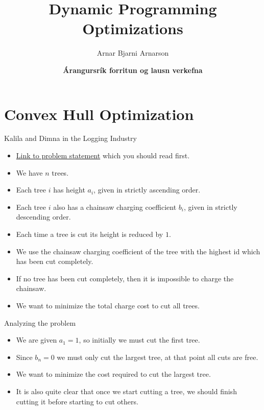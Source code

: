 \documentclass{beamer}
\title{Dynamic Programming Optimizations}
\author{Arnar Bjarni Arnarson}
\institute{\href{http://ru.is/td}{School of Computer Science} \\[2pt] \href{http://ru.is}{Reykjavík University}}
\date{\textbf{Árangursrík forritun og lausn verkefna}}
\begin{document}
\begin{frame}[plain]
    \titlepage
\end{frame}

\section*{Convex Hull Optimization}

\begin{frame}[plain]{Kalila and Dimna in the Logging Industry}
    \begin{itemize}
        \item<1-> \href{https://codeforces.com/problemset/problem/319/C}{Link to problem statement} which you should read first.
        \item<2-> We have $n$ trees.
        \item<3-> Each tree $i$ has height $a_i$, given in strictly ascending order.
        \item<4-> Each tree $i$ also has a chainsaw charging coefficient $b_i$, given in strictly descending order.
        \item<5-> Each time a tree is cut its height is reduced by $1$.
        \item<6-> We use the chainsaw charging coefficient of the tree with the highest id which has been cut completely.
        \item<7-> If no tree has been cut completely, then it is impossible to charge the chainsaw.
        \item<9-> We want to minimize the total charge cost to cut all trees.
    \end{itemize}
\end{frame}

\begin{frame}[plain]{Analyzing the problem}
    \begin{itemize}
        \item<1-> We are given $a_1 = 1$, so initially we must cut the first tree.
        \item<2-> Since $b_n = 0$ we must only cut the largest tree, at that point all cuts are free.
        \item<3-> We want to minimize the cost required to cut the largest tree.
        \item<4-> It is also quite clear that once we start cutting a tree, we should finish cutting it before starting to cut others.
    \end{itemize}
\end{frame}
\end{document}
